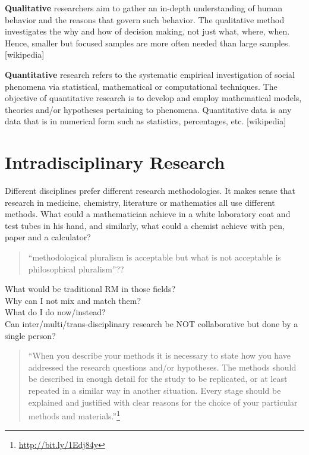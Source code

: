 \textbf{Qualitative}
researchers aim to gather an in-depth understanding of human behavior and the reasons that govern such behavior. The qualitative method investigates the why and how of decision making, not just what, where, when. Hence, smaller but focused samples are more often needed than large samples. [wikipedia]

\textbf{Quantitative}
research refers to the systematic empirical investigation of social phenomena via statistical, mathematical or computational techniques. The objective of quantitative research is to develop and employ mathematical models, theories and/or hypotheses pertaining to phenomena. Quantitative data is any data that is in numerical form such as statistics, percentages, etc. [wikipedia]


\section{Intradisciplinary Research}

Different disciplines prefer different research methodologies. It makes sense that research in medicine, chemistry, literature or mathematics all use different methods. What could a mathematician achieve in a white laboratory coat and test tubes in his hand, and similarly, what could a chemist achieve with pen, paper and a calculator?

\begin{quote}
  ``methodological pluralism is acceptable but what is not acceptable is philosophical pluralism''??
\end{quote}

\begin{fcom}
  What would be traditional RM in those fields?\\
  Why can I not mix and match them?\\
  What do I do now/instead?\\
  Can inter/multi/trans-disciplinary research be NOT collaborative but done by a single person?
\end{fcom}

\begin{quote}
  ``When you describe your methods it is necessary to state how you have addressed the research questions and/or hypotheses. The methods should be described in enough detail for the study to be replicated, or at least repeated in a similar way in another situation. Every stage should be explained and justified with clear reasons for the choice of your particular methods and materials.''\footnote{\url{http://bit.ly/1Edj84y}} %
\end{quote}

